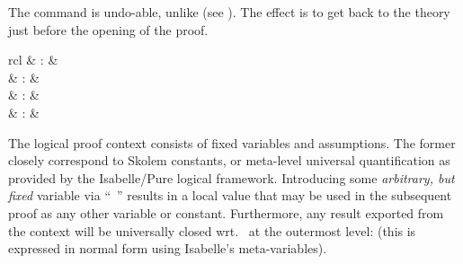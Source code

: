 \begin{isabellebody}
\begin{isamarkuptext}
  \medskip The \hyperlink{command.oops}{\mbox{}} command is undo-able, unlike
  \hyperlink{command.kill}{\mbox{}} (see ).  The effect is to
  get back to the theory just before the opening of the proof.%
\end{isamarkuptext}%
\isamarkuptrue%
%
\isamarkuptrue%
%
\isamarkuptrue%
%
\begin{isamarkuptext}%
\begin{matharray}{rcl}
    \hypertarget{command.fix}{\hyperlink{command.fix}{\mbox{}}} & : &  \\
    \hypertarget{command.assume}{\hyperlink{command.assume}{\mbox{}}} & : &  \\
    \hypertarget{command.presume}{\hyperlink{command.presume}{\mbox{}}} & : &  \\
    \hypertarget{command.def}{\hyperlink{command.def}{\mbox{}}} & : &  \\
  \end{matharray}

  The logical proof context consists of fixed variables and
  assumptions.  The former closely correspond to Skolem constants, or
  meta-level universal quantification as provided by the Isabelle/Pure
  logical framework.  Introducing some \emph{arbitrary, but fixed}
  variable via ``\hyperlink{command.fix}{\mbox{}}~'' results in a local value
  that may be used in the subsequent proof as any other variable or
  constant.  Furthermore, any result  exported from
  the context will be universally closed wrt.\  at the
  outermost level:  (this is expressed in normal
  form using Isabelle's meta-variables).


\end{isamarkuptext}
\end{isabellebody}
